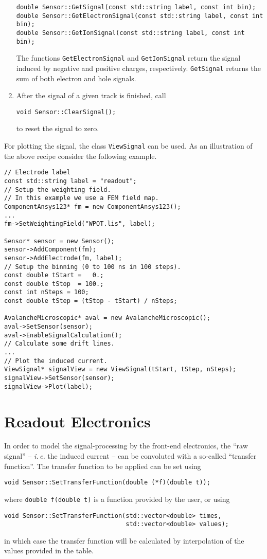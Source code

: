 \begin{enumerate}
\begin{lstlisting}
double Sensor::GetSignal(const std::string label, const int bin);
double Sensor::GetElectronSignal(const std::string label, const int bin);
double Sensor::GetIonSignal(const std::string label, const int bin); 
  \end{lstlisting}
  The functions \texttt{GetElectronSignal} and 
  \texttt{GetIonSignal} return the signal induced by negative 
  and positive charges, respectively. \texttt{GetSignal} returns 
  the sum of both electron and hole signals.   
  \item
  After the signal of a given track is finished, call
  \begin{lstlisting}
void Sensor::ClearSignal();
  \end{lstlisting}
  to reset the signal to zero.
\end{enumerate}

For plotting the signal, the class \texttt{ViewSignal} can be used.
As an illustration of the above recipe consider the following example. 
\begin{lstlisting}
// Electrode label
const std::string label = "readout";
// Setup the weighting field.
// In this example we use a FEM field map.
ComponentAnsys123* fm = new ComponentAnsys123();
...
fm->SetWeightingField("WPOT.lis", label);

Sensor* sensor = new Sensor();
sensor->AddComponent(fm);
sensor->AddElectrode(fm, label);
// Setup the binning (0 to 100 ns in 100 steps).
const double tStart =   0.;
const double tStop  = 100.;
const int nSteps = 100;
const double tStep = (tStop - tStart) / nSteps;

AvalancheMicroscopic* aval = new AvalancheMicroscopic();
aval->SetSensor(sensor);
aval->EnableSignalCalculation();
// Calculate some drift lines.
...
// Plot the induced current.
ViewSignal* signalView = new ViewSignal(tStart, tStep, nSteps);
signalView->SetSensor(sensor);
signalView->Plot(label);
\end{lstlisting}

\section{Readout Electronics}

In order to model the signal-processing by the front-end electronics, the 
``raw signal'' -- \textit{i.\,e.} the induced current -- 
can be convoluted with a so-called ``transfer function''. 
The transfer function to be applied can be set using
\begin{lstlisting}
void Sensor::SetTransferFunction(double (*f)(double t));
\end{lstlisting}
where \texttt{double f(double t)} is a function provided by the user, 
or using
\begin{lstlisting}
void Sensor::SetTransferFunction(std::vector<double> times,
                                 std::vector<double> values);
\end{lstlisting}
in which case the transfer function will be calculated by 
interpolation of the values provided in the table.

